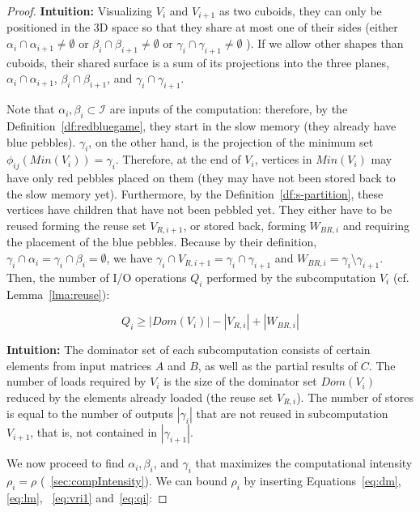 \documentclass[sigplan,review,anonymous]{acmart}\settopmatter{printfolios=true,printccs=false,printacmref=false}
\begin{document}
\begin{proof}
\textbf{Intuition:}
Visualizing $V_i$ and $V_{i+1}$ as two cuboids, they can only be positioned in 
the 3D space so that 
they share at most one of their sides (either $\alpha_i \cap \alpha_{i+1} \ne 
\emptyset$ or  $\beta_i \cap \beta_{i+1} \ne \emptyset$ or  $\gamma_i \cap 
\gamma_{i+1} \ne \emptyset$ ). If we allow other shapes than cuboids, 
their shared surface is a sum of its projections into the three planes,  
$\alpha_i \cap \alpha_{i+1}$,   $\beta_i \cap \beta_{i+1}$, and $\gamma_i \cap 
\gamma_{i+1}$.


Note that $\alpha_i, \beta_i \subset \mathcal{I}$ are inputs of the computation:
therefore,
by the Definition~\ref{df:redbluegame}, they start in the slow memory (they 
already have blue 
pebbles).
$\gamma_i$, on the other hand, is the projection of the
minimum set $\phi_{ij}(Min(V_i)) = \gamma_i$. Therefore, at the end of $V_i$, 
vertices in $Min(V_i)$ may have only red pebbles
placed on them (they may have not been stored back to the slow memory yet). 
Furthermore, by the Definition~\ref{df:s-partition}, these 
vertices have children that have not been pebbled yet. 
They either have to be reused forming the reuse set $V_{R,i+1}$, or
stored back, forming $W_{BR,i}$ and requiring the placement of the blue 
pebbles. 
Because by their definition, $\gamma_i \cap \alpha_i = \gamma_i \cap \beta_i = 
\emptyset$, we have $\gamma_i \cap V_{R,i+1} =  \gamma_i \cap
\gamma_{i+1}$ and $W_{BR,i} =  \gamma_i \setminus
\gamma_{i+1}$. Then, the number of I/O operations $Q_i$ performed by the 
subcomputation $V_i$ (cf. Lemma~\ref{lma:reuse}):

\begin{equation}
\label{eq:qi}
Q_i \ge |Dom(V_i)| - |V_{R,i}| + |W_{BR,i}|
\end{equation} 

\textbf{Intuition:} The dominator set of each subcomputation consists of certain
elements from input matrices $A$ and $B$, as well as the partial results
of $C$. The number of loads
required by $V_i$ is the size of the dominator set $Dom(V_i)$ reduced by the
elements already loaded (the reuse set $V_{R,i}$). The number of stores is 
equal to the
number of outputs $|\gamma_i|$  that are not reused in subcomputation 
$V_{i+1}$, that is, 
not contained in $|\gamma_{i+1}|$.

We now proceed to find $\alpha_i, \beta_i$, and $\gamma_i$
that maximizes the computational
intensity $\rho_i = \rho$ (~\cref{sec:compIntensity}).
We can bound $\rho_i$ by inserting Equations~\ref{eq:dm}, \ref{eq:lm}, 
~\ref{eq:vri1} and~\ref{eq:qi}:


\end{proof}
\end{document}
